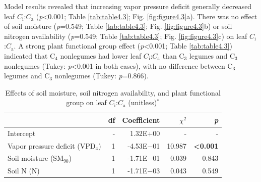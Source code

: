 Model results revealed that increasing vapor pressure deficit generally decreased leaf $C_\mathrm{i}$:$C_\mathrm{a}$ (\textit{p}<0.001; Table \ref{tab:table4.3}; Fig. \ref{fig:figure4.3}a). There was no effect of soil moisture (\textit{p}=0.549; Table \ref{tab:table4.3}; Fig. \ref{fig:figure4.3}b) or soil nitrogen availability (\textit{p}=0.549; Table \ref{tab:table4.3}; Fig. \ref{fig:figure4.3}c) on leaf $C_\mathrm{i}$:$C_\mathrm{a}$. A strong plant functional group effect (\textit{p}<0.001; Table \ref{tab:table4.3}) indicated that C$_4$ nonlegumes had lower leaf $C_\mathrm{i}$:$C_\mathrm{a}$ than C$_3$ legumes and C$_3$ nonlegumes (Tukey: \textit{p}<0.001 in both cases), with no difference between C$_3$ legumes and C$_3$ nonlegumes (Tukey: \textit{p}=0.866).

\newpage
\begin{table}
    \centering
    \caption[Effects of soil moisture, soil nitrogen availability, and plant functional group on leaf $C_\mathrm{i}$:$C_\mathrm{a}$]{Effects of soil moisture, soil nitrogen availability, and plant functional group on leaf $C_\mathrm{i}$:$C_\mathrm{a}$ (unitless)$^*$}
        \begin{tabular}{p{6cm}p{0.5cm}p{2cm}p{1.5cm}p{1.5cm}}
            \hline 
            & \multicolumn{1}{r}{df} 
            & \multicolumn{1}{r}{Coefficient} 
            & \multicolumn{1}{r}{$\chi^{2}$} 
            & \multicolumn{1}{r}{\textit{p}} 
            \\ 
            \hline
            
            Intercept
            & \multicolumn{1}{r}{-}
            & \multicolumn{1}{r}{1.32E+00}
            & \multicolumn{1}{r}{-}
            & \multicolumn{1}{r}{-}
            \\

            Vapor pressure deficit (VPD$_4$)
            & \multicolumn{1}{r}{1}
            & \multicolumn{1}{r}{-4.53E$-$01}
            & \multicolumn{1}{r}{10.987}
            & \multicolumn{1}{r}{\textbf{<0.001}}
            \\

            Soil moisture (SM$_{90}$)
            & \multicolumn{1}{r}{1}
            & \multicolumn{1}{r}{-1.71E$-$01}
            & \multicolumn{1}{r}{0.039}
            & \multicolumn{1}{r}{0.843}
            \\

            Soil N (N)
            & \multicolumn{1}{r}{1}
            & \multicolumn{1}{r}{-1.71E$-$03}
            & \multicolumn{1}{r}{0.043}
            & \multicolumn{1}{r}{0.549}
            \\


\end{tabular}
\end{table}
